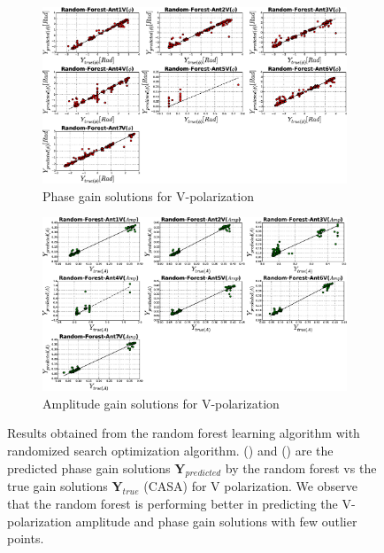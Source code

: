 \begin{figure}[H]
   \centering
    \begin{subfigure}[t]{0.52\textheight}
        
        \includegraphics[width=\textwidth]{images/Random-ForestVphase.eps} 
        \caption{Phase gain solutions for V-polarization} \label{A3}
    \end{subfigure}
    
      \begin{subfigure}[t]{0.52\textheight}
       
        \includegraphics[width=\textwidth]{images/Random-ForestVamp.eps} 
        \caption{Amplitude gain solutions for V-polarization} \label{B3}
    \end{subfigure}
    \caption{Results obtained from the random forest learning algorithm with randomized search optimization algorithm. () and () are the predicted phase gain solutions $\textbf{Y}_{predicted}$ by the random forest vs the true gain solutions $\textbf{Y}_{true}$ (CASA) for V polarization. We observe that the random forest is performing better in predicting the V-polarization amplitude and phase gain solutions with few outlier points. }
    \label{BBB2}
    \end{figure} 
   
